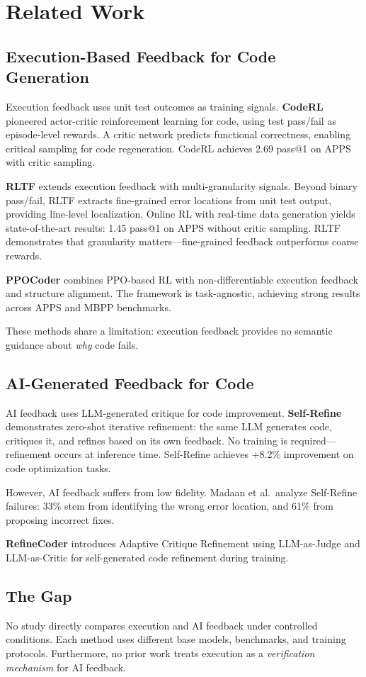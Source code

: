 \section{Related Work}
\label{sec:related}

\subsection{Execution-Based Feedback for Code Generation}

Execution feedback uses unit test outcomes as training signals. \textbf{CodeRL} \citep{le2022coderl} pioneered actor-critic reinforcement learning for code, using test pass/fail as episode-level rewards. A critic network predicts functional correctness, enabling critical sampling for code regeneration. CodeRL achieves 2.69 pass@1 on APPS with critic sampling.

\textbf{RLTF} \citep{liu2023rltf} extends execution feedback with multi-granularity signals. Beyond binary pass/fail, RLTF extracts fine-grained error locations from unit test output, providing line-level localization. Online RL with real-time data generation yields state-of-the-art results: 1.45 pass@1 on APPS without critic sampling. RLTF demonstrates that granularity matters---fine-grained feedback outperforms coarse rewards.

\textbf{PPOCoder} \citep{shojaee2023ppocoder} combines PPO-based RL with non-differentiable execution feedback and structure alignment. The framework is task-agnostic, achieving strong results across APPS and MBPP benchmarks.

These methods share a limitation: execution feedback provides no semantic guidance about \emph{why} code fails.

\subsection{AI-Generated Feedback for Code}

AI feedback uses LLM-generated critique for code improvement. \textbf{Self-Refine} \citep{madaan2023selfrefine} demonstrates zero-shot iterative refinement: the same LLM generates code, critiques it, and refines based on its own feedback. No training is required---refinement occurs at inference time. Self-Refine achieves +8.2\% improvement on code optimization tasks.

However, AI feedback suffers from low fidelity. Madaan et al.\ analyze Self-Refine failures: 33\% stem from identifying the wrong error location, and 61\% from proposing incorrect fixes.

\textbf{RefineCoder} \citep{zhou2025refinecoder} introduces Adaptive Critique Refinement using LLM-as-Judge and LLM-as-Critic for self-generated code refinement during training.

\subsection{The Gap}

No study directly compares execution and AI feedback under controlled conditions. Each method uses different base models, benchmarks, and training protocols. Furthermore, no prior work treats execution as a \emph{verification mechanism} for AI feedback.
